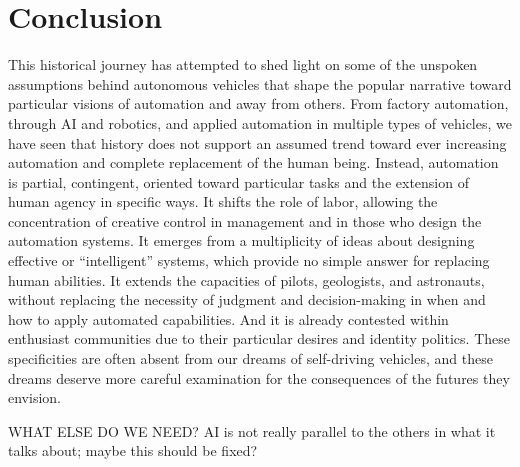 
\section{Conclusion}


This historical journey has attempted
to shed light on some of the unspoken assumptions behind autonomous
vehicles that shape the popular narrative toward
particular visions of automation and away from others. From factory
automation, through AI and robotics, and applied automation in
multiple types of vehicles, we have seen that history does not support
an assumed trend toward ever increasing automation and complete
replacement of the human being. Instead, automation is partial,
contingent, oriented toward particular tasks and the extension of
human agency in specific ways. It shifts the role of labor, allowing
the concentration of creative control in management and in those who
design the automation systems. It emerges from a multiplicity of ideas
about designing effective or ``intelligent'' systems, which provide no
simple answer for replacing human abilities. It extends the capacities of
pilots, geologists, and astronauts, without replacing the necessity of
judgment and decision-making in when and how to apply automated
capabilities. And it is already contested within enthusiast
communities due to their particular desires and identity politics.
These specificities are often absent
from our dreams of self-driving vehicles, and these dreams deserve
more careful examination for the consequences of the futures they envision.

WHAT ELSE DO WE NEED? AI is not really parallel to the others in what
it talks about; maybe this should be fixed?




